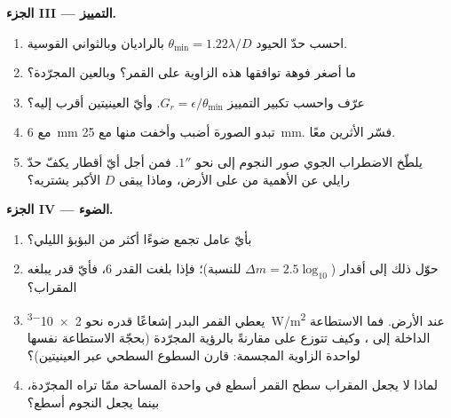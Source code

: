 \begin{problem}
\medskip
\noindent\textbf{الجزء III --- التمييز.}
\begin{enumerate}[resume]
  \item احسب حدّ الحيود $\theta_{\min} = 1.22\lambda/D$
        بالراديان وبالثواني القوسية.
  \item ما أصغر فوهة توافقها هذه الزاوية على
        القمر؟ وبالعين المجرّدة؟
  \item عرّف واحسب تكبير التمييز $G_r =
        \epsilon/\theta_{\min}$. وأيّ العينيتين أقرب إليه؟
  \item مع  \qty{6}{mm} تبدو الصورة أضبب
        وأخفت منها مع \qty{25}{mm}. فسّر الأثرين معًا.
  \item يلطّخ الاضطراب الجوي صور النجوم إلى نحو $1''$. فمن أجل
        أيّ أقطار  يكفّ حدّ رايلي عن
        الأهمية من على الأرض، وماذا يبقى $D$ الأكبر يشتريه؟
\end{enumerate}

\medskip
\noindent\textbf{الجزء IV --- الضوء.}
\begin{enumerate}[resume]
  \item بأيّ عامل تجمع  ضوءًا أكثر من
        البؤبؤ الليلي؟
  \item حوّل ذلك إلى أقدار ($\Delta m = 2.5\log_{10}$ للنسبة)؛
        فإذا بلغت  القدر $6$، فأيّ قدر يبلغه
        المقراب؟
  \item يعطي القمر البدر إشعاعًا قدره نحو
        \qty{2e-3}{W/m^2} عند الأرض. فما الاستطاعة الداخلة إلى
        ، وكيف تتوزع على  مقارنةً
        بالرؤية  المجرّدة (بحجّة الاستطاعة نفسها لواحدة الزاوية
        المجسمة: قارن السطوع السطحي عبر العينيتين)؟
  \item لماذا لا يجعل المقراب سطح القمر أسطع في واحدة
        المساحة ممّا تراه  المجرّدة، بينما يجعل النجوم
        أسطع؟
\end{enumerate}


\end{problem}
